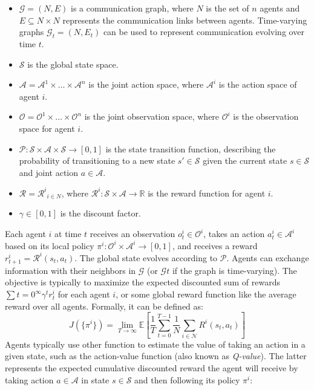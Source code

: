 \documentclass[sigconf]{acmart}
\begin{document}
\begin{itemize}
  \item $\mathcal{G} = (N, E)$ is a communication graph, where $N$ is the set of $n$ agents and $E \subseteq N \times N$ represents the communication links between agents. 
  Time-varying graphs $\mathcal{G}_t = (N, E_t)$ can be used to represent communication evolving over time $t$.
  \item $\mathcal{S}$ is the global state space.
  \item $\mathcal{A} = \mathcal{A}^1 \times \dots \times \mathcal{A}^n$ is the joint action space, where $\mathcal{A}^i$ is the action space of agent $i$.
  \item $\mathcal{O} = \mathcal{O}^1 \times \dots \times \mathcal{O}^n$ is the joint observation space, where $\mathcal{O}^i$ is the observation space for agent $i$.
  \item $\mathcal{P}: \mathcal{S} \times \mathcal{A} \times \mathcal{S} \to [0, 1]$ is the state transition function, describing the probability of transitioning to a new state $s' \in \mathcal{S}$ given the current state $s \in \mathcal{S}$ and joint action $a \in \mathcal{A}$.
  \item $\mathcal{R} = {\mathcal{R}^i}_{i \in N}$, where $\mathcal{R}^i: \mathcal{S} \times \mathcal{A} \to \mathbb{R}$ is the reward function for agent $i$.
  \item $\gamma \in [0, 1]$ is the discount factor.
\end{itemize}
Each agent $i$ at time $t$ receives an observation $o^i_t \in \mathcal{O}^i$, 
takes an action $a^i_t \in \mathcal{A}^i$ based on its local policy $\pi^i: \mathcal{O}^i \times \mathcal{A}^i \to [0,1]$, and receives a reward $r^i_{t+1} = \mathcal{R}^i(s_t, a_t)$. 
%
The global state evolves according to $\mathcal{P}$. 
Agents can exchange information with their neighbors in $\mathcal{G}$ 
(or $\mathcal{G}t$ if the graph is time-varying). 
%
The objective is typically to maximize the expected discounted sum of rewards $\sum{t=0}^{\infty} \gamma^t r^i_t$ for each agent $i$, 
or some global reward function like the average reward over all agents.
Formally, it can be defined as:
\[ J(\{\pi^i\}) = \lim_{T \to \infty} \mathbb{E} \left[ \frac{1}{T} \sum_{t=0}^{T-1} \frac{1}{N} \sum_{i \in \mathcal{N}} R^i(s_t, a_t) \right] \]
Agents typically use other function to estimate the value of taking an action in a given state, such as the action-value function (also known as \emph{Q-value}). 
The latter represents the expected cumulative discounted reward the agent will receive by taking action $a \in \mathcal{A}$ in state $s \in \mathcal{S}$ and then following its policy $\pi^i$:
\end{document}
